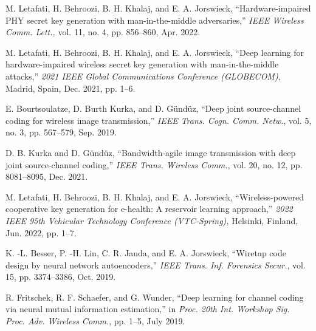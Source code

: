\documentclass[conference]{IEEEtran}
\begin{document}
{{\begin{thebibliography}{10}
		M. Letafati, H. Behroozi, B. H. Khalaj, and E. A. Jorswieck, ``Hardware-impaired
		PHY secret key generation with man-in-the-middle adversaries,''
		\emph{IEEE Wireless Comm. Lett.,} vol. 11, no. 4, pp. 856--860, Apr.
		2022.
		
		
		M. Letafati, H. Behroozi, B. H. Khalaj, and E. A. Jorswieck,   ``Deep learning for hardware-impaired wireless
		secret key generation with man-in-the-middle attacks,'' \emph{2021 IEEE Global Communications Conference (GLOBECOM),} Madrid, Spain, Dec. 2021, pp. 1--6. 
	
		
		
		
		E. Bourtsoulatze, D. Burth Kurka,  and D. Gündüz, ``Deep joint source-channel coding for wireless image transmission,'' \emph{IEEE Trans. Cogn. Comm.  Netw.}, vol. 5, no. 3, pp. 567--579, Sep. 2019. 
		
		
		
		
		D. B. Kurka and D. Gündüz, ``Bandwidth-agile image transmission with deep joint source-channel coding,''  \emph{IEEE Trans.  Wireless Comm.}, vol. 20, no. 12, pp. 8081--8095, Dec. 2021.  
		
		
		M. Letafati, H. Behroozi, B. H. Khalaj, and E. A. Jorswieck,   ``Wireless-powered cooperative key generation for e-health: A reservoir learning approach,'' \emph{2022 IEEE 95th Vehicular Technology Conference (VTC-Spring),} Helsinki, Finland, Jun. 2022, pp. 1--7. 
		
	
		
		{K. -L. Besser, P. -H. Lin, C. R. Janda, and E. A. Jorswieck, ``Wiretap code design by neural network autoencoders,'' \emph{IEEE Trans.  Inf.  Forensics Secur.}, vol. 15, pp. 3374--3386, Oct. 2019.}
		

%		
		
		R. Fritschek, R. F. Schaefer, and G. Wunder, ``Deep learning for channel
		coding via neural mutual information estimation,'' in \emph{Proc. 20th Int.
			Workshop Sig. Proc. Adv. Wireless Comm.}, pp. 1--5, July
		2019.  
		

\end{thebibliography}}}
\end{document}
